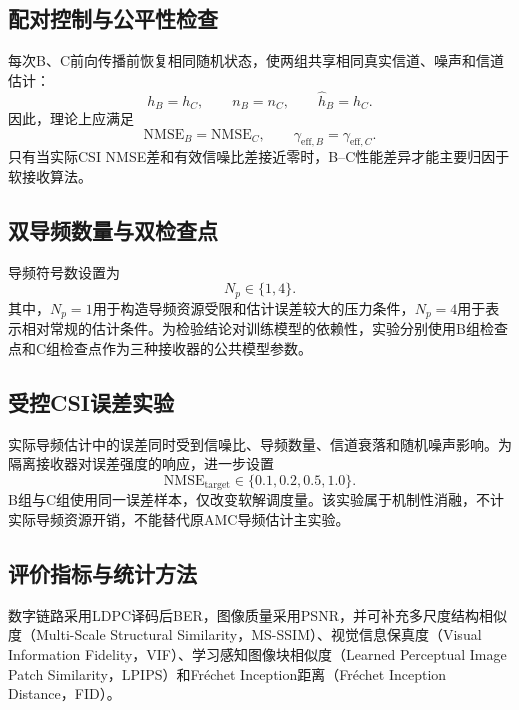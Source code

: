 \documentclass[UTF8,a4paper,11pt]{ctexart}
\newcommand{\CSI}{CSI}
\newcommand{\AMC}{AMC}
\newcommand{\BER}{BER}
\newcommand{\PSNR}{PSNR}
\newcommand{\NMSE}{NMSE}
\newcommand{\LDPC}{LDPC}
\begin{document}
\subsection{配对控制与公平性检查}
每次B、C前向传播前恢复相同随机状态，使两组共享相同真实信道、噪声和信道估计：
\begin{equation}
  h_B=h_C,
  \qquad
  n_B=n_C,
  \qquad
  \hat h_B=\hat h_C.
  \label{eq:paired_conditions}
\end{equation}
因此，理论上应满足
\begin{equation}
  \mathrm{NMSE}_B=\mathrm{NMSE}_C,
  \qquad
  \gamma_{\mathrm{eff},B}=\gamma_{\mathrm{eff},C}.
  \label{eq:paired_fairness}
\end{equation}
只有当实际\CSI{} \NMSE{}差和有效信噪比差接近零时，B--C性能差异才能主要归因于软接收算法。

\subsection{双导频数量与双检查点}
导频符号数设置为
\begin{equation}
  N_p\in\{1,4\}.
  \label{eq:pilot_number}
\end{equation}
其中，$N_p=1$用于构造导频资源受限和估计误差较大的压力条件，$N_p=4$用于表示相对常规的估计条件。为检验结论对训练模型的依赖性，实验分别使用B组检查点和C组检查点作为三种接收器的公共模型参数。

\subsection{受控CSI误差实验}
实际导频估计中的误差同时受到信噪比、导频数量、信道衰落和随机噪声影响。为隔离接收器对误差强度的响应，进一步设置
\begin{equation}
  \mathrm{NMSE}_{\mathrm{target}}
  \in\{0.1,0.2,0.5,1.0\}.
  \label{eq:controlled_nmse}
\end{equation}
B组与C组使用同一误差样本，仅改变软解调度量。该实验属于机制性消融，不计实际导频资源开销，不能替代原\AMC{}导频估计主实验。

\subsection{评价指标与统计方法}
数字链路采用\LDPC{}译码后\BER{}，图像质量采用\PSNR{}，并可补充多尺度结构相似度（Multi-Scale Structural Similarity，MS-SSIM）\cite{wang2003msssim}、视觉信息保真度（Visual Information Fidelity，VIF）\cite{sheikh2006vif}、学习感知图像块相似度（Learned Perceptual Image Patch Similarity，LPIPS）\cite{zhang2018lpips}和Fr\'{e}chet Inception距离（Fr\'{e}chet Inception Distance，FID）\cite{heusel2017fid}。
\end{document}
